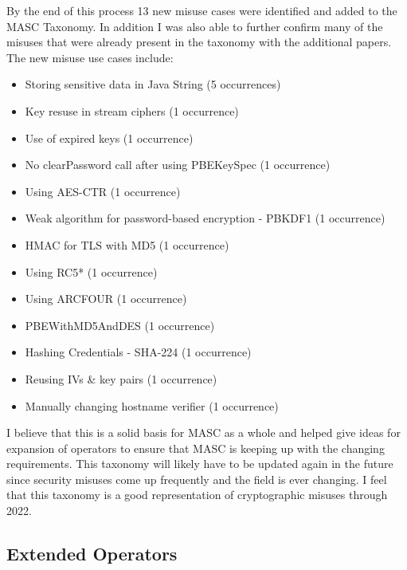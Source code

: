 By the end of this process 13 new misuse cases were identified and added to the MASC Taxonomy. In addition I was also able to further confirm many of the misuses that were already present in the taxonomy with the additional papers.
The new misuse use cases include:
\begin{itemize}
    \item Storing sensitive data in Java String (5 occurrences)
    \item Key resuse in stream ciphers (1 occurrence)
    \item Use of expired keys (1 occurrence)
    \item No clearPassword call after using PBEKeySpec (1 occurrence)
    \item Using AES-CTR (1 occurrence)
    \item Weak algorithm for password-based encryption - PBKDF1 (1 occurrence)
    \item HMAC for TLS with MD5 (1 occurrence)
    \item Using RC5*  (1 occurrence)
    \item Using ARCFOUR (1 occurrence)
    \item PBEWithMD5AndDES (1 occurrence)
    \item Hashing Credentials - SHA-224 (1 occurrence)
    \item Reusing IVs \& key pairs (1 occurrence)
    \item Manually changing hostname verifier (1 occurrence)
\end{itemize}

I believe that this is a solid basis for MASC as a whole and helped give ideas for expansion of operators to ensure that MASC is keeping up with the changing requirements. This taxonomy will likely have to be updated again in the future since security misuses come up frequently and the field is ever changing. I feel that this taxonomy is a good representation of cryptographic misuses through 2022.

\subsection{Extended Operators}
\label{ch2:sec:operators}

